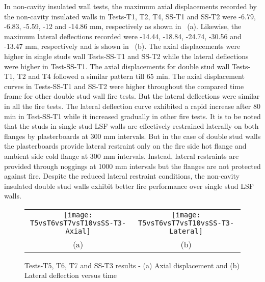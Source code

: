 In non-cavity insulated wall tests, the maximum axial displacements recorded by the non-cavity insulated walls in Tests-T1, T2, T4, SS-T1 and SS-T2 were -6.79, -6.83, -5.59, -12 and -14.86 mm, respectively as shown in ~(a). Likewise, the maximum lateral deflections recorded were -14.44, -18.84, -24.74, -30.56 and -13.47 mm, respectively and is shown in ~(b). The axial displacements were higher in single studs wall Tests-SS-T1 and SS-T2 while the lateral deflections were higher in Test-SS-T1. The axial displacements for double stud wall Tests-T1, T2 and T4 followed a similar pattern till 65 min. The axial displacement curves in Tests-SS-T1 and SS-T2 were higher throughout the compared time frame for other double stud wall fire tests. But the lateral deflections were similar in all the fire tests. The lateral deflection curve exhibited a rapid increase after 80 min in Test-SS-T1 while it increased gradually in other fire tests. It is to be noted that the studs in single stud LSF walls are effectively restrained laterally on both flanges by plasterboards at 300 mm intervals. But in the case of double stud walls the plasterboards provide lateral restraint only on the fire side hot flange and ambient side cold flange at 300 mm intervals. Instead, lateral restraints are provided through noggings at 1000 mm intervals but the flanges are not protected against fire. Despite the reduced lateral restraint conditions, the non-cavity insulated double stud walls exhibit better fire performance over single stud LSF walls.
\begin{figure}[!htbp]
	\centering
		\begin{tabular}{cc}
			\texttt{[image: T5vsT6vsT7vsT10vsSS-T3-Axial]} & \texttt{[image: T5vsT6vsT7vsT10vsSS-T3-Lateral]} \\ 
			(a) & (b)  \\ 
		\end{tabular} 
		\caption{Tests-T5, T6, T7 and SS-T3 results - (a) Axial displacement and (b) Lateral deflection versus time}
		\label{fig:T5vsT6vsT7vsT10vsSS-T3-Displacement}
\end{figure}

